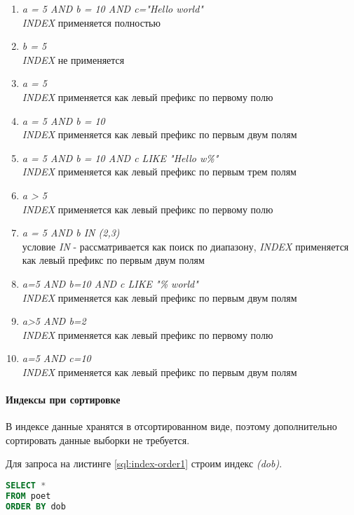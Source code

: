 \begin{enumerate}
\item \textit{a = 5 AND b = 10 AND c="Hello world"} \\  \textit{INDEX} применяется полностью
\item \textit{b = 5} \\   \textit{INDEX} не применяется
\item \textit{a = 5} \\  \textit{INDEX} применяется как левый префикс по первому полю
\item \textit{a = 5 AND b = 10} \\  \textit{INDEX} применяется как левый префикс по первым двум полям
\item \textit{a = 5 AND b = 10 AND c LIKE "Hello w\%"}  \\  \textit{INDEX} применяется как левый префикс по первым трем полям
\item \textit{a > 5} \\  \textit{INDEX} применяется как левый префикс по первому полю
\item \textit{a = 5 AND b IN (2,3)} \\ условие \textit{IN} - рассматривается как поиск по диапазону, \textit{INDEX} применяется как левый префикс по первым двум полям
\item \textit{a=5 AND b=10 AND c LIKE "\% world"} \\  \textit{INDEX} применяется как левый префикс по первым двум полям
\item \textit{a>5 AND b=2} \\ \textit{INDEX} применяется как левый префикс по первому полю
\item \textit{a=5 AND c=10} \\ \textit{INDEX} применяется как левый префикс по первым двум полям
\end{enumerate}


\paragraph{Индексы при сортировке}

В индексе данные хранятся в отсортированном виде, поэтому дополнительно сортировать данные выборки не требуется.


Для запроса на листинге \ref{sql:index-order1} строим индекс \textit{(dob)}.

\begin{lstlisting}[language=sql, label=sql:index-order1, caption={запрос для index-order}]
SELECT * 
FROM poet
ORDER BY dob
\end{lstlisting}


